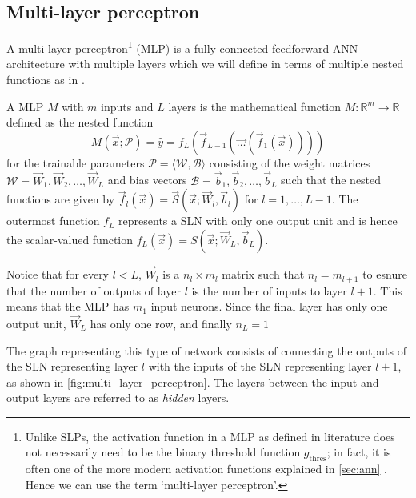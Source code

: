 \subsection{Multi-layer perceptron}
\label{sec:multi_layer_perceptron}
A multi-layer perceptron\footnote{Unlike SLPs, the activation function in a MLP as defined in literature does not necessarily need to be the binary threshold function $g_\text{thres}$; in fact, it is often one of the more modern activation functions explained in \ref{sec:ann} \cite{hastie2017,burkov2019}. Hence we can use the term `multi-layer perceptron'.} (MLP) is a fully-connected feedforward ANN architecture with multiple layers which we will define in terms of multiple nested functions as in \textcite{burkov2019}.
\begin{definition}
    \label{def:mlp}
    A MLP $M$ with $m$ inputs and $L$ layers is the mathematical function
    $M : \mathbb{R}^m \rightarrow \mathbb{R}$ defined as the nested function
    \begin{equation}
        M(\vec{x}; \mathscr{P})
            = \hat{y}
            = f_L \left(
                \vec{f}_{L-1} \left(
                    \vec{\dots} \left(
                        \vec{f}_1 \left(
                            \vec{x}
                        \right)
                    \right)
                \right)
            \right)
    \end{equation}
    for the trainable parameters $\mathscr{P}=\langle\mathscr{W},\mathscr{B}\rangle$
    consisting of the weight matrices
    $\mathscr{W} = \vec{W}_1, \vec{W}_2, \dots, \vec{W}_L$
    and bias vectors
    $\mathscr{B} = \vec{b}_1, \vec{b}_2, \dots, \vec{b}_L$
    such that the nested functions are given by $\vec{f}_l(\vec{x}) = \vec{S}(\vec{x}; \vec{W}_l, \vec{b}_l)$ for $l = 1, \dots, L-1$.
    The outermost function $f_L$ represents a SLN with only one output unit and is hence the scalar-valued function $f_L(\vec{x}) = S(\vec{x}; \vec{W}_L, \vec{b}_L)$.
\end{definition}

Notice that for every $l < L$, $\vec{W}_l$ is a $n_l \times m_l$ matrix such that $n_l=m_{l+1}$ to esnure that the number of outputs of layer $l$ is the number of inputs to layer $l+1$.
This means that the MLP has $m_1$ input neurons.
Since the final layer has only one output unit, $\vec{W}_L$ has only one row, and finally $n_L=1$

The graph representing this type of network consists of connecting the outputs of the SLN representing layer $l$ with the inputs of the SLN representing layer $l+1$, as shown in \ref{fig:multi_layer_perceptron}. 
The layers between the input and output layers are referred to as \textit{hidden} layers.

